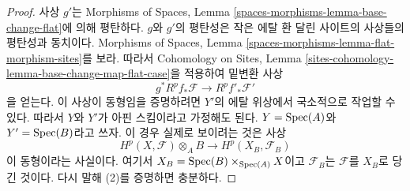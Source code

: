 \begin{proof}
사상 $g'$는 Morphisms of Spaces, Lemma
\ref{spaces-morphisms-lemma-base-change-flat}에 의해 평탄하다.
$g$와 $g'$의 평탄성은 작은 에탈 환 달린 사이트의 사상들의
평탄성과 동치이다. Morphisms of Spaces, Lemma
\ref{spaces-morphisms-lemma-flat-morphism-sites}를 보라. 따라서
Cohomology on Sites, Lemma
\ref{sites-cohomology-lemma-base-change-map-flat-case}을 적용하여
밑변환 사상
$$
g^*R^pf_*\mathcal{F} \longrightarrow R^pf'_*\mathcal{F}'
$$
을 얻는다. 이 사상이 동형임을 증명하려면 $Y'$의 에탈 위상에서
국소적으로 작업할 수 있다. 따라서 $Y$와 $Y'$가 아핀 스킴이라고
가정해도 된다. $Y = \mathop{\mathrm{Spec}}(A)$와 $Y' = \mathop{\mathrm{Spec}}(B)$라고 쓰자.
이 경우 실제로 보이려는 것은 사상
$$
H^p(X, \mathcal{F}) \otimes_A B \longrightarrow H^p(X_B, \mathcal{F}_B)
$$
이 동형이라는 사실이다. 여기서
$X_B = \mathop{\mathrm{Spec}}(B) \times_{\mathop{\mathrm{Spec}}(A)} X$이고 $\mathcal{F}_B$는
$\mathcal{F}$를 $X_B$로 당긴 것이다. 다시 말해 (2)를 증명하면 충분하다.


\end{proof}
